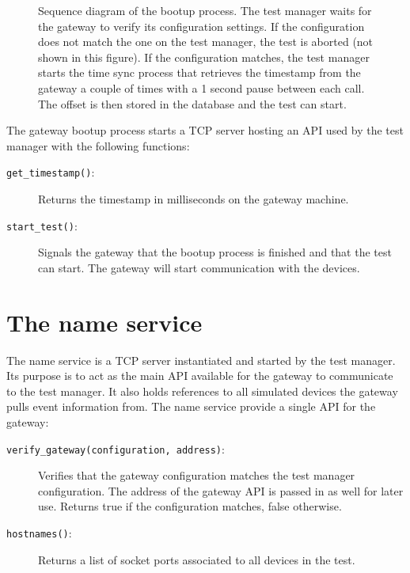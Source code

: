 \begin{figure}[h!]

    \caption[Sequence diagram of the bootup process.]{Sequence diagram of the
    bootup process. The test manager waits for the gateway to verify its
    configuration settings. If the configuration does not match the one on the
    test manager, the test is aborted (not shown in this figure). If the
    configuration matches, the test manager starts the time sync process that
    retrieves the timestamp from the gateway a couple of times with a 1 second
    pause between each call. The offset is then stored in the database and the
    test can start.}

    \label{fig:bootup_process}
\end{figure}

The gateway bootup process starts a TCP server hosting an API used by the test
manager with the following functions:

\begin{description}

    \item[\texttt{get\_timestamp()}:] Returns the timestamp in milliseconds on
        the gateway machine.

    \item[\texttt{start\_test()}:] Signals the gateway that the bootup process
        is finished and that the test can start. The gateway will start
        communication with the devices.

\end{description}

\section{The name service}

The name service is a TCP server instantiated and started by the test manager.
Its purpose is to act as the main API available for the gateway to communicate
to the test manager. It also holds references to all simulated devices the
gateway pulls event information from. The name service provide a single API for
the gateway:

\begin{description}

    \item[\texttt{verify\_gateway(configuration, address)}:] Verifies that the
        gateway configuration matches the test manager configuration. The
        address of the gateway API is passed in as well for later use. Returns
        true if the configuration matches, false otherwise.

    \item[\texttt{hostnames()}:] Returns a list of socket ports associated to
        all devices in the test.

\end{description}

